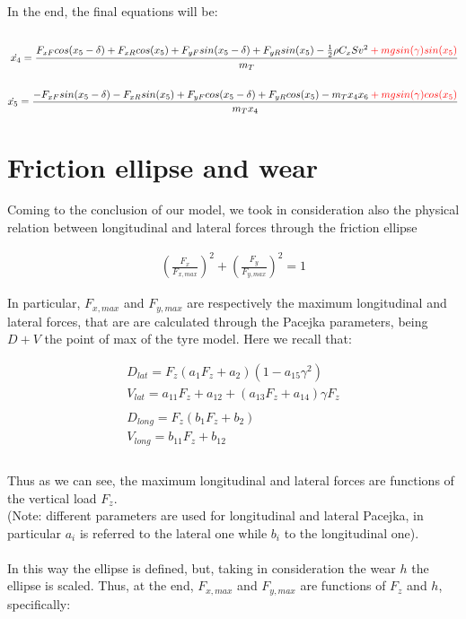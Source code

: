 \documentclass{report}
\let\Oldsection\section
\renewcommand{\section}{\FloatBarrier\Oldsection}
\begin{document}
In the end, the final equations will be:
\begin{equation}
\begin{aligned}
\\
\dot{x_4} = \frac{F_{xF} cos(x_5-\delta) + F_{xR} cos(x_5) + F_{yF} sin(x_5-\delta) + F_{yR} sin(x_5) -\frac{1}{2} \rho C_x S v^2 \color{red} + mgsin(\gamma) sin(x_5) \color{black}}{m_T} \\
\\
\dot{x_5} = \frac{-F_{xF} sin(x_5-\delta) - F_{xR} sin(x_5) + F_{yF} cos(x_5-\delta) + F_{yR} cos(x_5) - m_T x_4 x_6 \color{red} + mgsin(\gamma) cos(x_5) \color{black}}{m_T x_4} \\
\end{aligned}
\end{equation}


\section{Friction ellipse and wear}
Coming to the conclusion of our model, we took in consideration also the physical relation between longitudinal and lateral forces through the friction ellipse

\begin{equation}
\begin{aligned}
{(\frac{F_x}{F_{x,max}})}^2 + {(\frac{F_y}{F_{y,max}})}^2 = 1
\end{aligned}
\end{equation}

In particular, $F_{x,max}$ and $F_{y,max}$ are respectively the maximum longitudinal and lateral forces, that are are calculated through the Pacejka parameters, being $D + V$ the point of max of the tyre model. Here we recall that: 

\begin{equation}
\begin{aligned}
D_{lat} = F_z (a_1 F_z + a_2) (1 - a_{15} \gamma^2)\\
V_{lat} = a_{11}F_z + a_{12} + (a_{13} F_z + a_{14}) \gamma F_z\\\\
D_{long} = F_z (b_1 F_z + b_2)\\
V_{long} = b_{11}F_z + b_{12} \\\\
\end{aligned}
\end{equation}

Thus as we can see, the maximum longitudinal and lateral forces are functions of the vertical load $F_z$.\\(Note: different parameters are used for longitudinal and lateral Pacejka, in particular $a_i$ is referred to the lateral one while $b_i$ to the longitudinal one).\\\\
In this way the ellipse is defined, but, taking in consideration the wear $h$ the ellipse is scaled. Thus, at the end, $F_{x,max}$ and $F_{y,max}$ are functions of $F_z$ and $h$, specifically:
\end{document}
